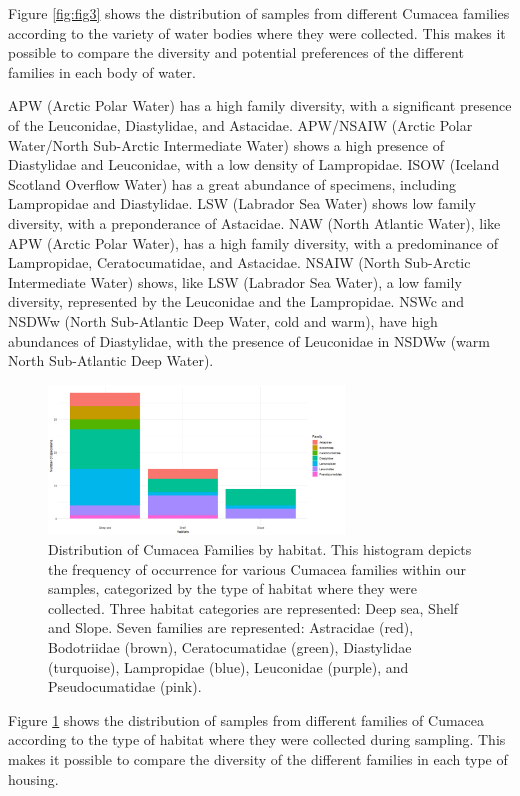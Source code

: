 Figure \ref{fig:fig3} shows the distribution of samples from different Cumacea families according to the variety of water bodies where they were collected. This makes it possible to compare the diversity and potential preferences of the different families in each body of water.

APW (Arctic Polar Water) has a high family diversity, with a significant presence of the Leuconidae, Diastylidae, and Astacidae. APW/NSAIW (Arctic Polar Water/North Sub-Arctic Intermediate Water) shows a high presence of Diastylidae and Leuconidae, with a low density of Lampropidae. ISOW (Iceland Scotland Overflow Water) has a great abundance of specimens, including Lampropidae and Diastylidae. LSW (Labrador Sea Water) shows low family diversity, with a preponderance of Astacidae. NAW (North Atlantic Water), like APW (Arctic Polar Water), has a high family diversity, with a predominance of Lampropidae, Ceratocumatidae, and Astacidae. NSAIW (North Sub-Arctic Intermediate Water) shows, like LSW (Labrador Sea Water), a low family diversity, represented by the Leuconidae and the Lampropidae. NSWc and NSDWw (North Sub-Atlantic Deep Water, cold and warm), have high abundances of Diastylidae, with the presence of Leuconidae in NSDWw (warm North Sub-Atlantic Deep Water).

\begin{figure}[]
    \centering
    \includegraphics[width=0.7\textwidth]{figure4.png}
    \caption{Distribution of Cumacea Families by habitat. This histogram depicts the frequency of occurrence for various Cumacea families within our samples, categorized by the type of habitat where they were collected. Three habitat categories are represented: Deep sea, Shelf and Slope. Seven families are represented: Astracidae (red), Bodotriidae (brown), Ceratocumatidae (green), Diastylidae (turquoise), Lampropidae (blue), Leuconidae (purple), and Pseudocumatidae (pink).  \label{fig:fig4}}
\end{figure}

Figure \ref{fig:fig4} shows the distribution of samples from different families of Cumacea according to the type of habitat where they were collected during sampling. This makes it possible to compare the diversity of the different families in each type of housing.

